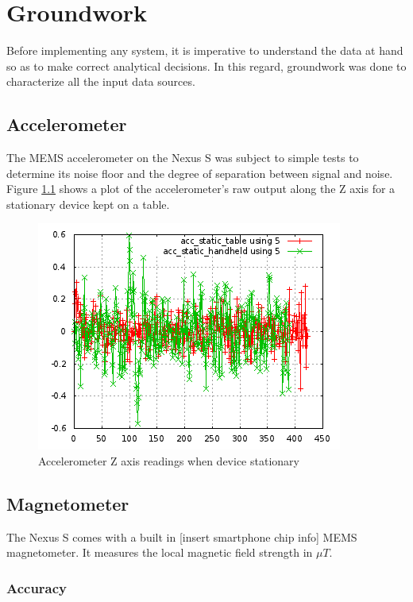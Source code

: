 \chapter{Groundwork\label{chap:groundwork}}


Before implementing any system, it is imperative to understand the data at hand
so as to make correct analytical decisions. In this regard, groundwork was done
to characterize all the input data sources.

\section{Accelerometer}

The MEMS accelerometer on the Nexus S was subject to simple tests to determine 
its noise floor and the degree of separation between signal and noise.
Figure \ref{fig:accel_static} shows a plot of the accelerometer's raw output 
along the Z axis for a stationary device kept on a table. 

\begin{figure}\centering
    \includegraphics{figures/accel_static.png}
    \caption{Accelerometer Z axis readings when device stationary\label{fig:accel_static}}
\end{figure}

\section{Magnetometer}

The Nexus S comes with a built in [insert smartphone chip info] MEMS magnetometer.
It measures the local magnetic field strength in $\mu T$.

\subsection{Accuracy}

